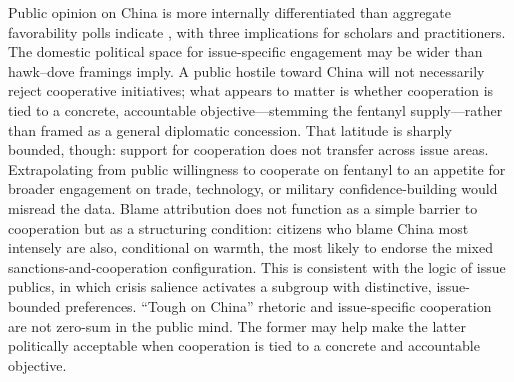 \documentclass[12pt,letterpaper]{article}
\begin{document}
Public opinion on China is more internally differentiated than aggregate favorability polls indicate \citep{li_more_2021}, with three implications for scholars and practitioners. The domestic political space for issue-specific engagement may be wider than hawk--dove framings imply. A public hostile toward China will not necessarily reject cooperative initiatives; what appears to matter is whether cooperation is tied to a concrete, accountable objective---stemming the fentanyl supply---rather than framed as a general diplomatic concession. That latitude is sharply bounded, though: support for cooperation does not transfer across issue areas. Extrapolating from public willingness to cooperate on fentanyl to an appetite for broader engagement on trade, technology, or military confidence-building would misread the data. Blame attribution does not function as a simple barrier to cooperation but as a structuring condition: citizens who blame China most intensely are also, conditional on warmth, the most likely to endorse the mixed sanctions-and-cooperation configuration. This is consistent with the logic of issue publics, in which crisis salience activates a subgroup with distinctive, issue-bounded preferences. ``Tough on China'' rhetoric and issue-specific cooperation are not zero-sum in the public mind. The former may help make the latter politically acceptable when cooperation is tied to a concrete and accountable objective.

\end{document}

